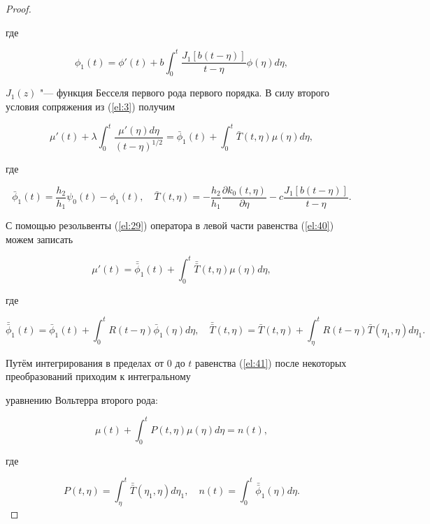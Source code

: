 \begin{proof}
\begin{equation}
\end{equation}

где

$$\phi_1(t)=\phi'(t)+b\int_0^t\frac{J_1[b(t-\eta)]}{t-\eta}\phi(\eta)d\eta,$$

$J_1(z)$ "--- функция Бесселя первого рода первого порядка. В силу второго условия сопряжения из (\ref{el:3}) получим

\begin{equation} \label{el:40}

\mu'(t)+\lambda\int_0^t\frac{\mu'(\eta)d\eta}{(t-\eta)^{1/2}}=\bar{\phi}_1(t)+\int_0^t\bar{T}(t,\eta)\mu(\eta)d\eta,

\end{equation}

где

$$\bar{\phi}_1(t)=\frac{h_2}{h_1}\psi_0(t)-\phi_1(t), \quad \bar{T}(t,\eta)=-\frac{h_2}{h_1}\frac{\partial k_0(t,\eta)}{\partial

\eta}-c\frac{J_1[b(t-\eta)]}{t-\eta}.

$$



С помощью резольвенты (\ref{el:29}) оператора в левой части равенства (\ref{el:40}) можем записать

\begin{equation} \label{el:41}

\mu'(t)=\bar{\bar{\phi}}_1(t)+\int_0^t\bar{\bar{T}}(t,\eta)\mu(\eta)d\eta,

\end{equation}

где

$$\bar{\bar{\phi}}_1(t)=\bar{\phi}_1(t)+\int_0^tR(t-\eta)\bar{\phi}_1(\eta)d\eta, \quad

\bar{\bar{T}}(t,\eta)=\bar{T}(t,\eta)+\int_{\eta}^tR(t-\eta)\bar{T}(\eta_1,\eta)d\eta_1.$$



Путём интегрирования в пределах от $0$ до $t$ равенства (\ref{el:41}) после некоторых преобразований приходим к интегральному 

уравнению Вольтерра второго рода:

\begin{equation} \label{el:42}

\mu(t)+\int_0^tP(t,\eta)\mu(\eta)d\eta=n(t),

\end{equation}

где

$$P(t,\eta)=\int_{\eta}^t\bar{\bar{T}}(\eta_1,\eta)d\eta_1, \quad n(t)=\int_0^t\bar{\bar{\phi}}_1(\eta)d\eta.$$




\end{proof}
